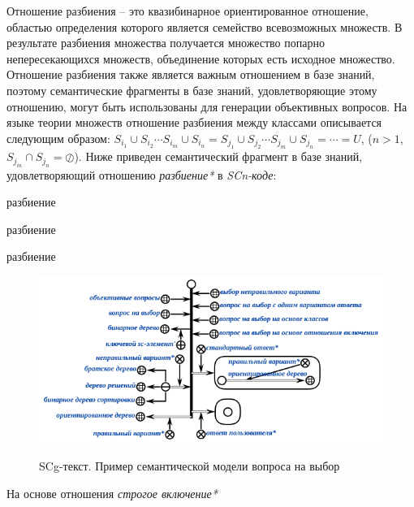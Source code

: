 \begin{textitemize}
\begin{textitemize}
		Отношение разбиения – это квазибинарное ориентированное отношение, областью определения которого является семейство всевозможных множеств. В  результате разбиения множества получается множество попарно непересекающихся множеств, объединение которых есть исходное множество. Отношение разбиения также является важным отношением в базе знаний, поэтому семантические фрагменты в базе знаний, удовлетворяющие этому отношению, могут быть использованы для генерации объективных вопросов. На языке теории множеств отношение разбиения между классами описывается следующим образом: $S_{i_{1}}\cup  S_{i_{2}}\cdots S_{i_{m}} \cup S_{i_{n}} = S_{j_{1}}\cup  S_{j_{2}}\cdots S_{j_{m}} \cup S_{j_{n}}= \cdots = U$, ($n>1$, $S_{j_{m}} \cap S_{j_{n}} = \oslash$). Ниже приведен семантический фрагмент в базе знаний, удовлетворяющий отношению \textit{разбиение*} в \textit{SCn-коде}:
		\begin{SCn}
			\begin{scnrelfromset}{разбиение}
			\end{scnrelfromset}
			\begin{scnrelfromset}{разбиение}
			\end{scnrelfromset}
			\begin{scnrelfromset}{разбиение}
			\end{scnrelfromset}
		\end{SCn}
		\begin{figure}[H]
			\caption{SCg-текст. Пример семантической модели вопроса на выбор}
			\includegraphics[scale=1]{author/part7/figures/MC_question_example.png}
			\label{fig:mc_example}
		\end{figure}
		
		\item На основе отношения \textit{строгое включение*}
		

\end{textitemize}
\end{textitemize}
